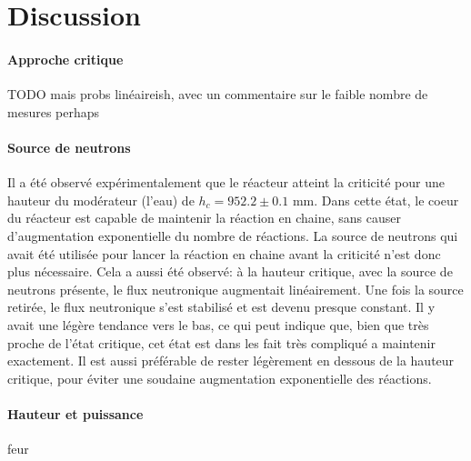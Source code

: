 \section{Discussion}

\paragraph{Approche critique}
TODO mais probs linéaireish, avec un commentaire sur le faible nombre de mesures perhaps

\paragraph{Source de neutrons}
Il a été observé expérimentalement que le réacteur atteint la criticité pour une hauteur du modérateur (l'eau) de \(h_c = 952.2 \pm 0.1\) mm. Dans cette état, le coeur du réacteur est capable de maintenir la réaction en chaine, sans causer d'augmentation exponentielle du nombre de réactions. La source de neutrons qui avait été utilisée pour lancer la réaction en chaine avant la criticité n'est donc plus nécessaire. Cela a aussi été observé: à la hauteur critique, avec la source de neutrons présente, le flux neutronique augmentait linéairement. Une fois la source retirée, le flux neutronique s'est stabilisé et est devenu presque constant. Il y avait une légère tendance vers le bas, ce qui peut indique que, bien que très proche de l'état critique, cet état est dans les fait très compliqué a maintenir exactement. Il est aussi préférable de rester légèrement en dessous de la hauteur critique, pour éviter une soudaine augmentation exponentielle des réactions.

\paragraph{Hauteur et puissance}
feur